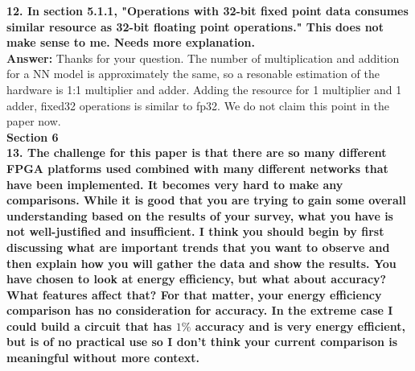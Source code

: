 \documentclass[12pt]{paper}
\newcommand{\answer}[1]{\noindent\textbf{Answer:} #1}
\newcommand{\comment}[1]{\noindent\textbf{#1}\\}
\begin{document}
\comment{12. In section 5.1.1, "Operations with 32-bit fixed point data consumes similar resource as 32-bit floating point operations." This does not make sense to me. Needs more explanation.}

\answer{Thanks for your question. The number of multiplication and addition for a NN model is approximately the same, so a resonable estimation of the hardware is 1:1 multiplier and adder. Adding the resource for 1 multiplier and 1 adder, fixed32 operations is similar to fp32. We do not claim this point in the paper now. }\\

{\noindent\textbf{Section 6}}\\

\comment{13. The challenge for this paper is that there are so many different FPGA platforms used combined with many different networks that have been implemented.  It becomes very hard to make any comparisons.  While it is good that you are trying to gain some overall understanding based on the results of your survey, what you have is not well-justified and insufficient. I think you should begin by first discussing what are important trends that you want to observe and then explain how you will gather the data and show the results. You have chosen to look at energy efficiency, but what about accuracy? What features affect that?  For that matter, your energy efficiency comparison has no consideration for accuracy. In the extreme case I could build a circuit that has $1\%$ accuracy and is very energy efficient, but is of no practical use so I don't think your current comparison is meaningful without more context.}
\end{document}
